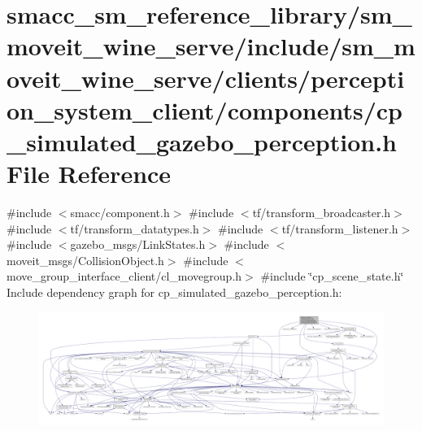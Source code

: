 \hypertarget{sm__moveit__wine__serve_2include_2sm__moveit__wine__serve_2clients_2perception__system__client_23965b489a229ed486b9e3b302468f3db}{}\section{smacc\+\_\+sm\+\_\+reference\+\_\+library/sm\+\_\+moveit\+\_\+wine\+\_\+serve/include/sm\+\_\+moveit\+\_\+wine\+\_\+serve/clients/perception\+\_\+system\+\_\+client/components/cp\+\_\+simulated\+\_\+gazebo\+\_\+perception.h File Reference}
\label{sm__moveit__wine__serve_2include_2sm__moveit__wine__serve_2clients_2perception__system__client_23965b489a229ed486b9e3b302468f3db}
{\ttfamily \#include $<$smacc/component.\+h$>$}\newline
{\ttfamily \#include $<$tf/transform\+\_\+broadcaster.\+h$>$}\newline
{\ttfamily \#include $<$tf/transform\+\_\+datatypes.\+h$>$}\newline
{\ttfamily \#include $<$tf/transform\+\_\+listener.\+h$>$}\newline
{\ttfamily \#include $<$gazebo\+\_\+msgs/\+Link\+States.\+h$>$}\newline
{\ttfamily \#include $<$moveit\+\_\+msgs/\+Collision\+Object.\+h$>$}\newline
{\ttfamily \#include $<$move\+\_\+group\+\_\+interface\+\_\+client/cl\+\_\+movegroup.\+h$>$}\newline
{\ttfamily \#include \char`\"{}cp\+\_\+scene\+\_\+state.\+h\char`\"{}}\newline
Include dependency graph for cp\+\_\+simulated\+\_\+gazebo\+\_\+perception.\+h\+:
\nopagebreak
\begin{figure}[H]
\begin{center}
\leavevmode
\includegraphics[width=350pt]{sm__moveit__wine__serve_2include_2sm__moveit__wine__serve_2clients_2perception__system__client_242fe02c2d644ba792cfa21dd71f12e17}
\end{center}
\end{figure}
